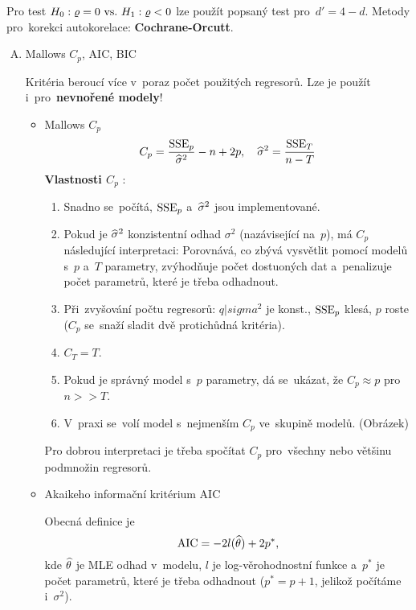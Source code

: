 \begin{remark}
	Pro test $H_0: \varrho = 0 ~\text{vs.}~ H_1: \varrho < 0$ lze použít popsaný test pro~$d' = 4 - d$. Metody pro~korekci autokorelace: \textbf{Cochrane-Orcutt}.
\end{remark}\begin{enumerate}[A)]

\item
Mallows $C_p$, AIC, BIC

Kritéria beroucí více v~poraz počet použitých regresorů. Lze je použít i~pro~\textbf{nevnořené modely}!
\begin{itemize}
\item Mallows $C_p$
 $$
C_p = \frac{\mathrm{SSE}_p}{\widehat{\sigma}^2} - n + 2p, \quad \widehat{\sigma}^2 = \frac{\mathrm{SSE}_T}{n-T}
 $$
\textbf{Vlastnosti $C_p$ }:
\begin{enumerate}[1)]
\item Snadno se~počítá, $\mathrm{SSE}_p$ a~$\widehat{\sigma}^2$ jsou implementované.
\item Pokud je $\widehat{\sigma}^2$ konzistentní odhad $\sigma^2$ (nazávisející na~$p$), má $C_p$ následující interpretaci: Porovnává, co zbývá vysvětlit pomocí modelů s~$p$ a~$T$ parametry, zvýhodňuje počet dostuoných dat a~penalizuje počet parametrů, které je třeba odhadnout.
\item Při~zvyšování počtu regresorů: $q|sigma^2$ je konst., $\mathrm{SSE}_p$ klesá, $p$ roste ($C_p$ se~snaží sladit dvě protichůdná kritéria).
\item $C_T = T$.
\item Pokud je správný model s~$p$ parametry, dá se~ukázat, že $C_p \approx p$ pro~$n >> T$.
\item V~praxi se~volí model s~nejmenším $C_p$ ve~skupině modelů. (Obrázek)
\end{enumerate}

\begin{remark}
Pro dobrou interpretaci je třeba spočítat $C_p$ pro~všechny nebo většinu podmnožin regresorů.
\end{remark}

\item
Akaikeho informační kritérium AIC

\newcommand{\AIC}{\mathrm{AIC}}
Obecná definice je
 $$
\AIC = -2l(\wtheta) + 2p^*,
 $$
kde $\widehat{\theta}$ je MLE odhad v~modelu, $l$ je log-věrohodnostní funkce a~$p^*$ je počet parametrů, které je třeba odhadnout ($p^* = p + 1$, jelikož počítáme i~$\sigma^2$).


\end{itemize}
\end{enumerate}
